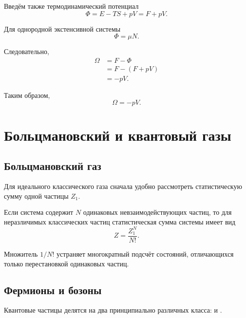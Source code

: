 \documentclass[../final.tex]{subfiles}
\begin{document}
Введём также термодинамический потенциал
%
\begin{equation*}
    \Phi
    =
    E
    -
    TS
    +
    pV
    =
    F+pV.
\end{equation*}

Для однородной экстенсивной системы
%
\begin{equation*}
    \Phi
    =
    \mu N.
\end{equation*}

Следовательно,
%
\begin{align*}
    \Omega
    &=
    F-\Phi
    \\[4pt]
    &=
    F-(F+pV)
    \\[4pt]
    &=
    -pV.
\end{align*}

Таким образом,
%
\[
    \boxed{
        \Omega
        =
        -pV
    }.
\]


\section{Больцмановский и квантовый газы}


\subsection{Больцмановский газ}

Для идеального классического газа сначала удобно рассмотреть
статистическую сумму одной частицы $Z_1$.

Если система содержит $N$ одинаковых невзаимодействующих частиц,
то для неразличимых классических частиц статистическая сумма системы
имеет вид
%
\[
    \boxed{
        Z
        =
        \frac{Z_1^N}{N!}
    }.
\]

Множитель $1/N!$ устраняет многократный подсчёт состояний,
отличающихся только перестановкой одинаковых частиц.


\subsection{Фермионы и бозоны}

Квантовые частицы делятся на два принципиально различных класса:
 и .
\end{document}
